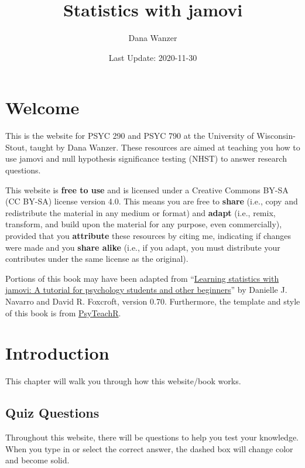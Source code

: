 \documentclass[
]{book}
\title{Statistics with jamovi}
\author{Dana Wanzer}
\date{Last Update: 2020-11-30}
\begin{document}
\maketitle

{
\setcounter{tocdepth}{1}
\tableofcontents
}
\hypertarget{welcome}{%
\chapter*{Welcome}\label{welcome}}

This is the website for PSYC 290 and PSYC 790 at the University of Wisconsin-Stout, taught by Dana Wanzer. These resources are aimed at teaching you how to use jamovi and null hypothesis significance testing (NHST) to answer research questions.

This website is \textbf{free to use} and is licensed under a Creative Commons BY-SA (CC BY-SA) license version 4.0. This means you are free to \textbf{share} (i.e., copy and redistribute the material in any medium or format) and \textbf{adapt} (i.e., remix, transform, and build upon the material for any purpose, even commercially), provided that you \textbf{attribute} these resources by citing me, indicating if changes were made and you \textbf{share alike} (i.e., if you adapt, you must distribute your contributes under the same license as the original).

Portions of this book may have been adapted from ``\href{http://www.learnstatswithjamovi.com}{Learning statistics with jamovi: A tutorial for psychology students and other beginners}'' by Danielle J. Navarro and David R. Foxcroft, version 0.70. Furthermore, the template and style of this book is from \href{https://psyteachr.github.io/book-template/setup.html}{PsyTeachR}.

\hypertarget{introduction}{%
\chapter{Introduction}\label{introduction}}

This chapter will walk you through how this website/book works.

\hypertarget{quiz-questions}{%
\section{Quiz Questions}\label{quiz-questions}}

Throughout this website, there will be questions to help you test your knowledge. When you type in or select the correct answer, the dashed box will change color and become solid.
\end{document}
